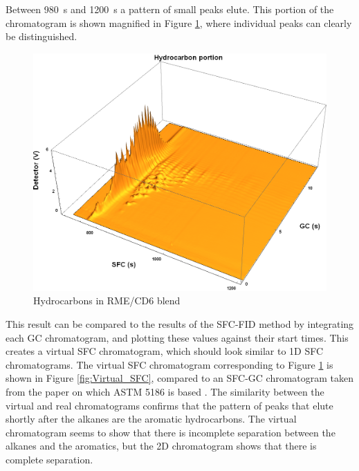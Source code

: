 Between \SI{980}{\second} and \SI{1200}{\second} a pattern of small peaks elute.
This portion of the chromatogram is shown magnified in Figure
\ref{fig:Hydrocarbons_Portion}, where individual peaks can clearly be distinguished.

\begin{figure}
	\centering
	\includegraphics[width=\textwidth]{Figures/Hydrocarbons_Portion.png}
	\decoRule	
	
\caption[Hydrocarbons in RME/CD6 blend.]{Hydrocarbons in RME/CD6 blend}
	
	\label{fig:Hydrocarbons_Portion} 
\end{figure}

This result can be compared to the results of the SFC-FID method by integrating
each \twoD GC chromatogram, and plotting these values against their start times.
This creates a virtual SFC chromatogram, which should look similar to 1D SFC
chromatograms. The virtual SFC chromatogram corresponding to Figure
\ref{fig:Hydrocarbons_Portion} is shown in Figure \ref{fig:Virtual_SFC},
compared to an SFC-GC chromatogram taken from the paper on which ASTM 5186 is
based \autocite{DiSanzo1991}. The similarity between the virtual and real
chromatograms confirms that the pattern of peaks that elute shortly after the
alkanes are the aromatic hydrocarbons. The virtual chromatogram seems to show
that there is incomplete separation between the alkanes and the aromatics, but
the 2D chromatogram shows that there is complete separation. 

